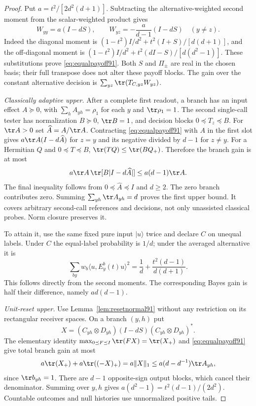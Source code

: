 \begin{proof}
Put $a=t^2/[2d^2(d+1)]$.  Subtracting the alternative-weighted
second moment from the scalar-weighted product gives
\begin{equation}\label{eq:equalpayoff91}
 W_{yy}=a(I-dS),\qquad
 W_{yz}=-\frac{a}{d-1}(I-dS)\quad(y\ne z).
\end{equation}
Indeed the diagonal moment is
$(1-t^2)I/d^2+t^2(I+S)/[d(d+1)]$, and the off-diagonal
moment is $(1-t^2)I/d^2+t^2(dI-S)/[d(d^2-1)]$.
These substitutions prove \eqref{eq:equalpayoff91}.
Both $S$ and $\Pi_\pm$ are real in the chosen basis; their full
transpose does not alter these payoff blocks.  The gain over the
constant alternative decision is $\sum_{yz}\tr(T_{C,yz}W_{yz})$.

\emph{Classically adaptive upper.}
After a complete first readout, a branch has an input effect
$A\succeq0$, with $\sum_h A_{yh}=\rho_1$ for each $y$ and
$\tr\rho_1=1$.  The second single-call tester has normalization
$B\succeq0$, $\tr B=1$, and decision blocks $0\preceq T_z\preceq B$.
For $\tr A>0$ set $\widehat A=A/\tr A$.
Contracting \eqref{eq:equalpayoff91} with $A$ in the first slot gives
$a\tr A(I-d\widehat A)$ for $z=y$ and its negative divided by
$d-1$ for $z\ne y$.  For a Hermitian $Q$ and $0\preceq T\preceq B$,
$\tr(TQ)\le\tr(BQ_+)$.  Therefore the branch gain is at most
\[
 a\tr A\,\tr[B|I-d\widehat A|]\le a(d-1)\tr A.
\]
The final inequality follows from $0\preceq\widehat A\preceq I$ and
$d\ge2$.  The zero branch contributes zero.
Summing $\sum_{yh}\tr A_{yh}=d$ proves the first upper bound.
It covers arbitrary second-call references and decisions, not only
unassisted classical probes.  Norm closure preserves it.

To attain it, use the same fixed pure input $|u\rangle$ twice and
declare $C$ on unequal labels.  Under $C$ the equal-label probability is
$1/d$; under the averaged alternative it is
\[
 \sum_{by}w_b\langle u,E_y^b(t)u\rangle^2
 =\frac1d+\frac{t^2(d-1)}{d(d+1)}.
\]
This follows directly from the second moments.  The corresponding
Bayes gain is half their difference, namely $ad(d-1)$.

\emph{Unit-reset upper.}
Use Lemma~\ref{lem:resetnormal91} without any restriction on its
rectangular receiver spaces.  On a branch $(y,h)$ put
\[
 X=(C_{yh}\otimes D_{yh})(I-dS)(C_{yh}\otimes D_{yh})^*.
\]
The elementary identity
$\max_{0\preceq F\preceq I}\tr(FX)=\tr(X_+)$ and
\eqref{eq:equalpayoff91} give total branch gain at most
\[
 a\tr(X_+)+a\tr((-X)_+)=a\|X\|_1
 \le a(d-d^{-1})\tr A_{yh},
\]
since $\tr b_{yh}=1$.  There are $d-1$ opposite-sign output blocks,
which cancel their denominator.  Summing over $y,h$ gives
$a(d^2-1)=t^2(d-1)/(2d^2)$.
Countable outcomes and null histories use unnormalized positive tails.


\end{proof}
